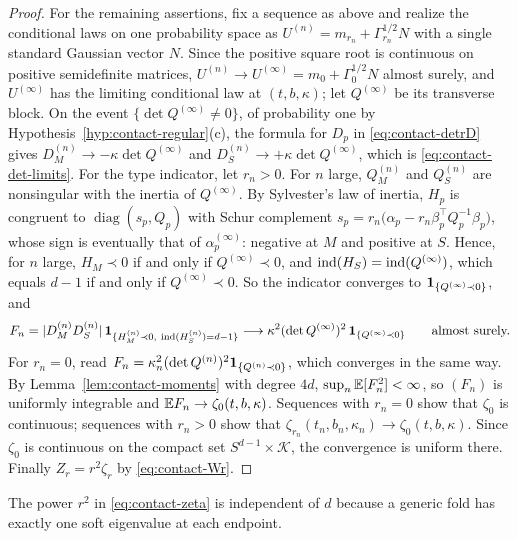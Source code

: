 \begin{proof}
For the remaining assertions, fix a sequence as above and realize the conditional laws on one probability space as $U^{(n)}=m_{r_n}+\Gamma_{r_n}^{1/2}N$ with a single standard Gaussian vector $N$. Since the positive square root is continuous on positive semidefinite matrices, $U^{(n)}\to U^{(\infty)}=m_0+\Gamma_0^{1/2}N$ almost surely, and $U^{(\infty)}$ has the limiting conditional law at $(t,b,\kappa)$; let $Q^{(\infty)}$ be its transverse block. On the event $\{\det Q^{(\infty)}\ne0\}$, of probability one by Hypothesis~\ref{hyp:contact-regular}(c), the formula for $D_p$ in \eqref{eq:contact-detrD} gives $D_M^{(n)}\to-\kappa\det Q^{(\infty)}$ and $D_S^{(n)}\to+\kappa\det Q^{(\infty)}$, which is \eqref{eq:contact-det-limits}. For the type indicator, let $r_n>0$. For $n$ large, $Q_M^{(n)}$ and $Q_S^{(n)}$ are nonsingular with the inertia of $Q^{(\infty)}$. By Sylvester's law of inertia, $H_p$ is congruent to $\operatorname{diag}(s_p,Q_p)$ with Schur complement $s_p=r_n\bigl(\alpha_p-r_n\beta_p^{\top}Q_p^{-1}\beta_p\bigr)$, whose sign is eventually that of $\alpha_{p}^{(\infty)}$: negative at $M$ and positive at $S$. Hence, for $n$ large, $H_M\prec0$ if and only if $Q^{(\infty)}\prec0$, and $\operatorname{ind}(H_S)=\operatorname{ind}(Q^{(\infty)})$, which equals $d-1$ if and only if $Q^{(\infty)}\prec0$. So the indicator converges to $\mathbf 1_{\{Q^{(\infty)}\prec0\}}$, and
\[
F_n=|D_M^{(n)}D_S^{(n)}|\,\ind_{\{H_M^{(n)}\prec0,\ \Ind(H_S^{(n)})=d-1\}}\longrightarrow\kappa^2(\det Q^{(\infty)})^2\,\ind_{\{Q^{(\infty)}\prec0\}}\qquad\text{almost surely.}
\]
For $r_n=0$, read $F_n=\kappa_n^2(\det Q^{(n)})^2\mathbf 1_{\{Q^{(n)}\prec0\}}$, which converges in the same way. By Lemma~\ref{lem:contact-moments} with degree $4d$, $\sup_n\mathbb E[F_n^2]<\infty$, so $(F_n)$ is uniformly integrable and $\mathbb E F_n\to\zeta_0(t,b,\kappa)$. Sequences with $r_n=0$ show that $\zeta_0$ is continuous; sequences with $r_n>0$ show that $\zeta_{r_n}(t_n,b_n,\kappa_n)\to\zeta_0(t,b,\kappa)$. Since $\zeta_0$ is continuous on the compact set $S^{d-1}\times\mathcal K$, the convergence is uniform there. Finally $Z_r=r^2\zeta_r$ by \eqref{eq:contact-Wr}.
\end{proof}

The power $r^2$ in \eqref{eq:contact-zeta} is independent of $d$ because a generic fold has exactly one soft eigenvalue at each endpoint.

